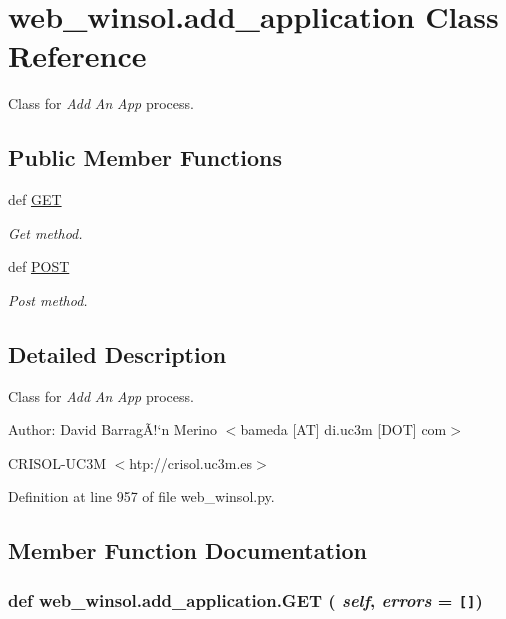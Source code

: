 \hypertarget{classweb__winsol_1_1add__application}{
\section{web\_\-winsol.add\_\-application Class Reference}
\label{classweb__winsol_1_1add__application}
}
Class for {\em Add\/} {\em An\/} {\em App\/} process.  


\subsection*{Public Member Functions}
\begin{CompactItemize}
\item 
def \hyperlink{classweb__winsol_1_1add__application_5571d6fe23a66936918631bef3cbfef7}{GET}
\begin{CompactList}\small\item\em Get method. \item\end{CompactList}\item 
def \hyperlink{classweb__winsol_1_1add__application_ab1c3da35e2b0634d90c7b84742f3883}{POST}
\begin{CompactList}\small\item\em Post method. \item\end{CompactList}\end{CompactItemize}


\subsection{Detailed Description}
Class for {\em Add\/} {\em An\/} {\em App\/} process. 

\begin{Desc}
\item[Author:]David Barrag\~{A}!`n Merino $<$bameda \mbox{[}AT\mbox{]} di.uc3m \mbox{[}DOT\mbox{]} com$>$ 

CRISOL-UC3M $<$htp://crisol.uc3m.es$>$ \end{Desc}




Definition at line 957 of file web\_\-winsol.py.

\subsection{Member Function Documentation}
\hypertarget{classweb__winsol_1_1add__application_5571d6fe23a66936918631bef3cbfef7}{
\subsubsection[GET]{\setlength{\rightskip}{0pt plus 5cm}def web\_\-winsol.add\_\-application.GET ( {\em self},  {\em errors} = {\tt \mbox{[}\mbox{]}})}}
\label{classweb__winsol_1_1add__application_5571d6fe23a66936918631bef3cbfef7}


